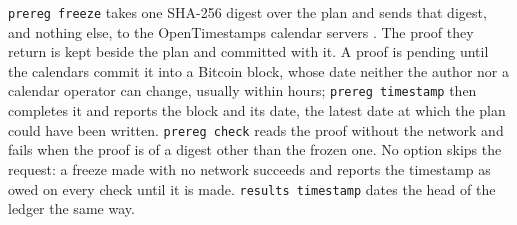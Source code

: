 \documentclass{article}
\newcommand{\code}[1]{\texttt{#1}}
\begin{document}
\code{prereg freeze} takes one SHA-256 digest over the plan and sends that digest, and nothing
else, to the OpenTimestamps calendar servers \citep{todd2016opentimestamps}. The proof they return
is kept beside the plan and committed with it. A proof is pending until the calendars commit it
into a Bitcoin block, whose date neither the author nor a calendar operator can change, usually
within hours; \code{prereg timestamp} then completes it and reports
the block and its date, the latest date at which the plan could have been written.
\code{prereg check} reads the proof without the network and fails when the proof is of a digest
other than the frozen one. No option skips the request: a freeze made with no network succeeds and
reports the timestamp as owed on every check until it is made. \code{results timestamp} dates the
head of the ledger the same way.





\clearpage


\clearpage


\clearpage

\end{document}
